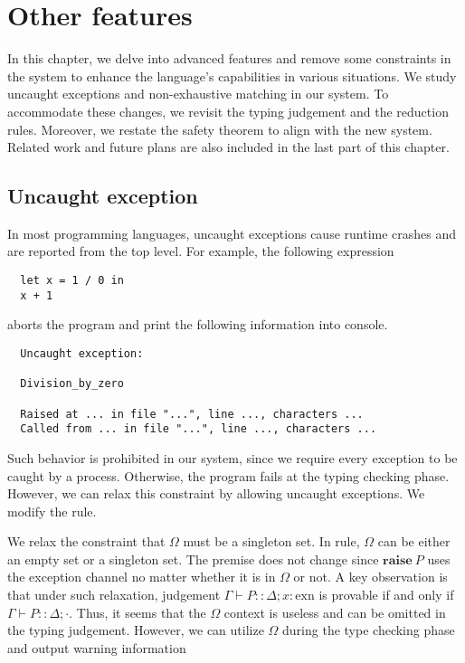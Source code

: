 \documentclass[12pt, openany]{memoir}
\newcommand*{\craise}[1]{\textbf{raise}\ #1}
\newcommand*{\judge}[4]{#1 \vdash #2 :: #3; #4}
\begin{document}
\chapter{Other features}
In this chapter, we delve into advanced features and remove some constraints in the system to enhance the language's 
capabilities in various situations. We study uncaught exceptions and non-exhaustive matching in our system. 
To accommodate these changes, we revisit the typing judgement and the reduction rules. Moreover, we restate the safety theorem to align with the new system. 
Related work and future plans are also included in the last part of this chapter.
\section{Uncaught exception}
In most programming languages, uncaught exceptions cause runtime crashes and are reported from the top level. For example, 
the following expression
\begin{verbatim}
  let x = 1 / 0 in
  x + 1  
\end{verbatim}
aborts the program and print the following information into console.
\begin{verbatim}
  Uncaught exception:                   
    
  Division_by_zero

  Raised at ... in file "...", line ..., characters ...
  Called from ... in file "...", line ..., characters ...
\end{verbatim}
Such behavior is prohibited in our system, since we require every exception to be caught by a process.
Otherwise, the program fails at the typing checking phase. However, we can relax this constraint by allowing uncaught exceptions.
We modify the  rule.
\begin{rules}
  \defrule[raise'][raise']{
    \judge{\Gamma}{P}{\Delta}{\cdot}
  }{\judge{\Gamma}{\craise{P}}{\Delta}{\Omega}}
\end{rules}
We relax the constraint that $\Omega$ must be a singleton set. In  rule, $\Omega$ can be either an empty set or a singleton set.
The premise does not change since $\craise{P}$ uses the exception channel no matter whether it is in $\Omega$ or not.
A key observation is that under such relaxation, judgement $\judge{\Gamma}{P}{\Delta}{x : \text{exn}}$ is provable if and only if
$\judge{\Gamma}{P}{\Delta}{\cdot}$. Thus, it seems that the $\Omega$ context is useless and can be omitted in the typing judgement.
However, we can utilize $\Omega$ during the type checking phase and output warning information
\end{document}
